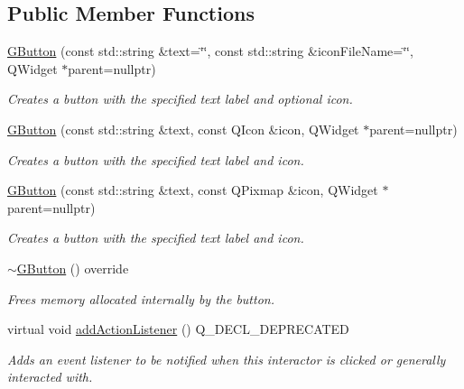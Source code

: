 \subsection*{Public Member Functions}
\begin{DoxyCompactItemize}
\item 
\mbox{\hyperlink{classsgl_1_1GButton_aff3f5308477262143eb2a857e7549e31}{G\+Button}} (const std\+::string \&text=\char`\"{}\char`\"{}, const std\+::string \&icon\+File\+Name=\char`\"{}\char`\"{}, Q\+Widget $\ast$parent=nullptr)
\begin{DoxyCompactList}\small\item\em Creates a button with the specified text label and optional icon. \end{DoxyCompactList}\item 
\mbox{\hyperlink{classsgl_1_1GButton_aecb1d20fb4707a3121600de27d5b3307}{G\+Button}} (const std\+::string \&text, const Q\+Icon \&icon, Q\+Widget $\ast$parent=nullptr)
\begin{DoxyCompactList}\small\item\em Creates a button with the specified text label and icon. \end{DoxyCompactList}\item 
\mbox{\hyperlink{classsgl_1_1GButton_a7bcc15aa469e535bb9030ba9a4c93116}{G\+Button}} (const std\+::string \&text, const Q\+Pixmap \&icon, Q\+Widget $\ast$parent=nullptr)
\begin{DoxyCompactList}\small\item\em Creates a button with the specified text label and icon. \end{DoxyCompactList}\item 
\mbox{\hyperlink{classsgl_1_1GButton_ae8f3d0d454867ef8bc9e7cd69e80f663}{$\sim$\+G\+Button}} () override
\begin{DoxyCompactList}\small\item\em Frees memory allocated internally by the button. \end{DoxyCompactList}\item 
virtual void \mbox{\hyperlink{classsgl_1_1GInteractor_a02f20ea6edfa0671f31c4c648a253833}{add\+Action\+Listener}} () Q\+\_\+\+D\+E\+C\+L\+\_\+\+D\+E\+P\+R\+E\+C\+A\+T\+ED
\begin{DoxyCompactList}\small\item\em Adds an event listener to be notified when this interactor is clicked or generally interacted with. \end{DoxyCompactList}\item 

\end{DoxyCompactItemize}
